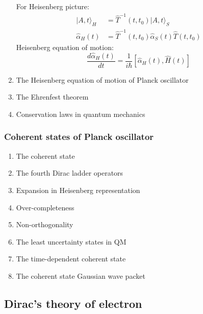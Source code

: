 \documentclass[12pt]{article}
\numberwithin{equation}{section}
\begin{document}
\begin{enumerate}
	For Heisenberg picture:
	\begin{equation} \begin{split}
		|A, t\rangle_H &= \hat{T}^{-1}(t, t_0)|A, t\rangle_S \\
		\hat{\alpha}_H(t) &= \hat{T}^{-1}(t, t_0)\hat{\alpha}_S(t)\hat{T}(t, t_0)
	\end{split} \end{equation}
	Heisenberg equation of motion:
	\begin{equation}
		\frac{d\hat{\alpha}_H(t)}{dt} = \frac{1}{i\hbar}[\hat{\alpha}_H(t), \hat{H}(t)]
	\end{equation}
\item The Heisenberg equation of motion of Planck oscillator
\item The Ehrenfest theorem
\item Conservation laws in quantum mechanics
\end{enumerate}
\subsubsection{Coherent states of Planck oscillator}
\begin{enumerate}
\item The coherent state
\item The fourth Dirac ladder operators
\item Expansion in Heisenberg representation
\item Over-completeness
\item Non-orthogonality
\item The least uncertainty states in QM
\item The time-dependent coherent state
\item The coherent state Gaussian wave packet
\end{enumerate}
\subsection{Dirac's theory of electron}
\end{document}
